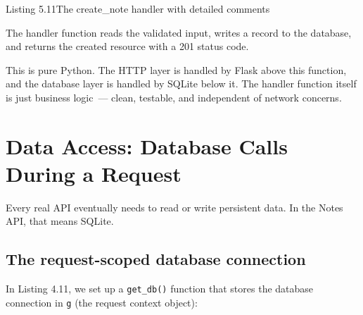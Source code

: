 \begin{codeboxcap}{\textcolor{accent}{Listing 5.11}\enspace The create\_note handler with detailed comments}
\begin{Shaded}
\begin{Highlighting}[]
\OperatorTok{=}
\OperatorTok{=}
        \NormalTok{,}
\NormalTok{    )}
\OperatorTok{=}

\NormalTok{    \}), }  
\end{Highlighting}
\end{Shaded}

\end{codeboxcap}

\noindent{}The handler function reads the validated input, writes a record to the database, and returns the created resource with a 201 status code.

This is pure Python. The HTTP layer is handled by Flask above this function, and the database layer is handled by SQLite below it. The handler function itself is just business logic~--- clean, testable, and independent of network concerns.

\setcounter{section}{7}
\section{Data Access: Database Calls During a Request}\label{05-internal-request-execution:58-data-access-database-calls-during-a-request}

Every real API eventually needs to read or write persistent data. In the Notes API, that means SQLite.

\subsection*{The request-scoped database connection}\label{05-internal-request-execution:the-request-scoped-database-connection}

In Listing 4.11, we set up a \texttt{get\_db()} function that stores the database connection in \texttt{g} (the request context object):

